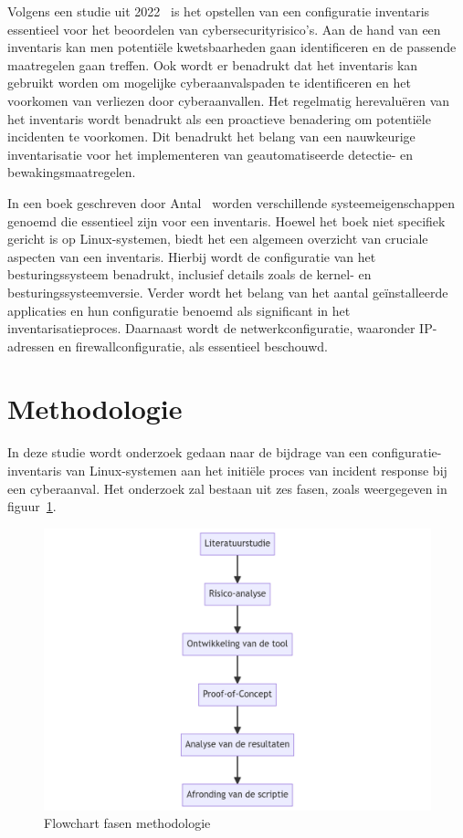 Volgens een studie uit 2022~\autocite{Kotenko2022} is het opstellen van een configuratie inventaris essentieel voor het beoordelen van cybersecurityrisico's.
Aan de hand van een inventaris kan men potenti\"ele kwetsbaarheden gaan identificeren en de passende maatregelen gaan treffen.
Ook wordt er benadrukt dat het inventaris kan gebruikt worden om mogelijke cyberaanvalspaden te identificeren en het voorkomen van verliezen door cyberaanvallen.
Het regelmatig herevalu\"eren van het inventaris wordt benadrukt als een proactieve benadering om potenti\"ele incidenten te voorkomen.
Dit benadrukt het belang van een nauwkeurige inventarisatie voor het implementeren van geautomatiseerde detectie- en bewakingsmaatregelen.

In een boek geschreven door Antal~\autocite{Antal2010} worden verschillende systeemeigenschappen genoemd die essentieel zijn voor een inventaris.
Hoewel het boek niet specifiek gericht is op Linux-systemen, biedt het een algemeen overzicht van cruciale aspecten van een inventaris.
Hierbij wordt de configuratie van het besturingssysteem benadrukt, inclusief details zoals de kernel- en besturingssysteemversie.
Verder wordt het belang van het aantal geïnstalleerde applicaties en hun configuratie benoemd als significant in het inventarisatieproces.
Daarnaast wordt de netwerkconfiguratie, waaronder IP-adressen en firewallconfiguratie, als essentieel beschouwd.

\section{Methodologie}%
\label{sec:methodologie}

In deze studie wordt onderzoek gedaan naar de bijdrage van een configuratie-inventaris van Linux-systemen aan het initi\"ele proces van incident response bij een cyberaanval.
Het onderzoek zal bestaan uit zes fasen, zoals weergegeven in figuur~\ref{fig:flowchart}.

\begin{figure}[h!]
    \includegraphics[width=.49\textwidth]
    {graphics/methodologie_flowchart.png}
    \caption{\label{fig:flowchart}Flowchart fasen methodologie}
\end{figure}


